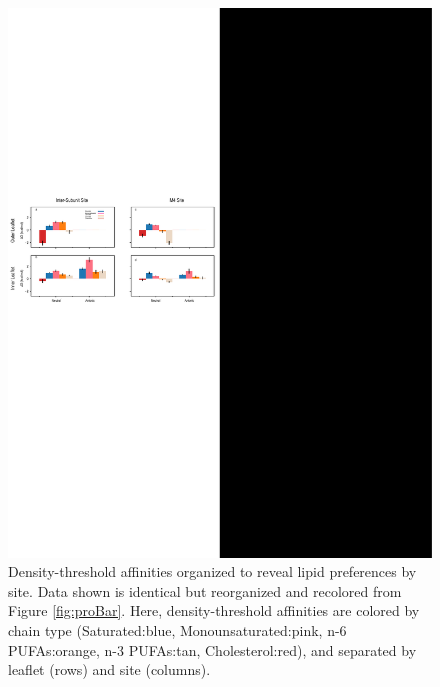 \documentclass[%
 aip,
 amsmath,amssymb,
 preprint,%
]{revtex4-1}\usepackage{setspace}
\newcommand{\newaffinities}{density-threshold affinities}
\newcommand{\Newaffinities}{Density-threshold affinities}
\newcommand{\grace}[1]{\textcolor{black}{{#1}}}
\begin{document}
\begin{figure}[!h]
	\center
	\includegraphics[width=\linewidth]{Lipid_centric.pdf}
	\caption{{\Newaffinities{} organized to reveal lipid preferences by site.} Data shown is identical but reorganized and recolored from Figure \ref{fig:proBar}. Here, \newaffinities{} are colored by chain type (Saturated:blue, Monounsaturated:pink, n-6 PUFAs:orange, n-3 PUFAs:tan, Cholesterol:red), and separated by leaflet (rows) and site (columns).} %
	\label{fig:lipidBar}
\end{figure}
\end{document}
